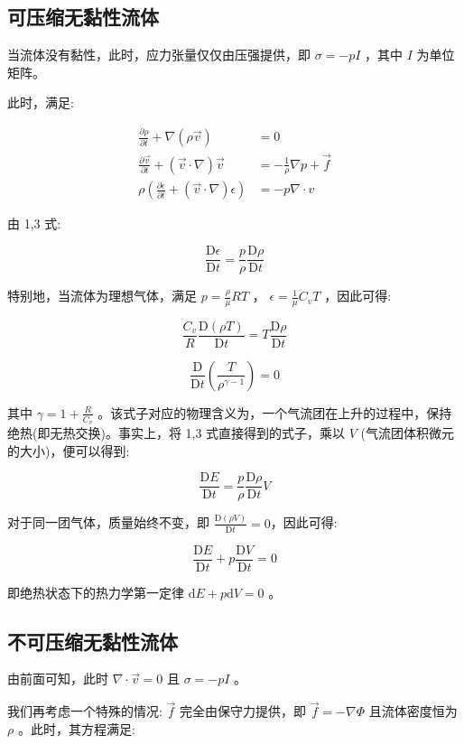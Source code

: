 \documentclass[fontset=windows]{article}
\begin{document}
\subsection{可压缩无黏性流体}

当流体没有黏性，此时，应力张量仅仅由压强提供，即 $\sigma = -p I$ ，其中 $I$ 为单位矩阵。

此时，满足:

$$
\begin{aligned}
    \frac{\partial \rho}{\partial t} + \nabla (\rho \vec{v}) &= 0 \\
    \frac{\partial \vec{v}}{\partial t} + (\vec{v} \cdot \nabla) \vec{v} &= - \frac{1}{\rho} \nabla {p} + \vec{f} \\
    \rho(\frac{\partial \epsilon}{\partial t} + (\vec{v} \cdot \nabla) \epsilon) &= -p \nabla \cdot v
\end{aligned}
$$

由 1,3 式:

$$
\frac{\mathrm{D}\epsilon}{\mathrm{D}t} = \frac{p}{\rho} \frac{\mathrm{D}\rho}{\mathrm{D}t}
$$

特别地，当流体为理想气体，满足 $p = \frac{\rho}{\mu} RT$ ， $\epsilon = \frac{1}{\mu} C_vT$ ，因此可得: 

$$
\frac{C_v}{R} \frac{\mathrm{D}(\rho T)}{\mathrm{D}t} = T \frac{\mathrm{D}\rho}{\mathrm{D}t}
$$

$$
\frac{\mathrm{D}}{\mathrm{D}t}(\frac{T}{\rho ^ {\gamma - 1}}) = 0
$$

其中 $\gamma = 1 + \frac{R}{C_v} $ 。该式子对应的物理含义为，一个气流团在上升的过程中，保持绝热(即无热交换)。事实上，将 1,3 式直接得到的式子，乘以 $V$ (气流团体积微元的大小)，便可以得到:

$$
\frac{\mathrm{D}E}{\mathrm{D}t} = \frac{p}{\rho} \frac{\mathrm{D}\rho}{\mathrm{D}t} V
$$

对于同一团气体，质量始终不变，即 $\frac{\mathrm{D}(\rho V)}{\mathrm{D}t} = 0$，因此可得:

$$
\frac{\mathrm{D}E}{\mathrm{D}t} + p \frac{\mathrm{D}V}{\mathrm{D}t} = 0
$$

即绝热状态下的热力学第一定律 $\mathrm{d}E + p \mathrm{d}V = 0$ 。

\subsection{不可压缩无黏性流体}

由前面可知，此时 $\nabla \cdot \vec{v} = 0$ 且 $\sigma = -p I$ 。

我们再考虑一个特殊的情况: $\vec{f}$ 完全由保守力提供，即 $\vec{f} = -\nabla \Phi$ 且流体密度恒为 $\rho$ 。此时，其方程满足:
\end{document}
